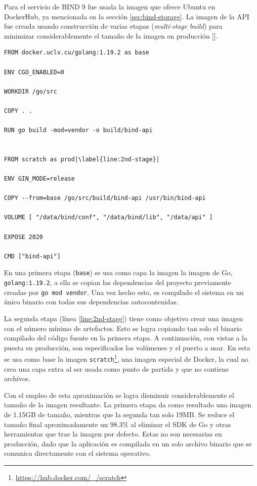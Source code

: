 Para el servicio de BIND 9 fue usada la imagen que ofrece Ubuntu en DockerHub, ya mencionada en la sección \ref{sec:bind-storage}. La imagen de la API fue creada usando construcción de varias etapas (\textit{multi-stage build}) para minimizar considerablemente el tamaño de la imagen en producción [\cite{multi-stage}].

\begin{lstlisting}[frame=single, escapechar=|, caption=Dockerfile para la API.]
FROM docker.uclv.cu/golang:1.19.2 as base

ENV CGO_ENABLED=0

WORKDIR /go/src

COPY . .

RUN go build -mod=vendor -o build/bind-api
    

FROM scratch as prod|\label{line:2nd-stage}|

ENV GIN_MODE=release

COPY --from=base /go/src/build/bind-api /usr/bin/bind-api

VOLUME [ "/data/bind/conf", "/data/bind/lib", "/data/api" ]

EXPOSE 2020

CMD ["bind-api"]
\end{lstlisting}

En una primera etapa (\verb|base|) se usa como capa la imagen la imagen de Go, \verb|golang:1.19.2|, a ella se copian las dependencias del proyecto previamente creadas por \verb|go mod vendor|. Una vez hecho esto, es compilado el sistema en un único binario con todas sus dependencias autocontenidas.

La segunda etapa (línea \ref{line:2nd-stage}) tiene como objetivo crear una imagen con el número mínimo de artefactos. Esto se logra copiando tan solo el binario compilado del código fuente en la primera etapa. A continuación, con vistas a la puesta en producción, son especificados los volúmenes y el puerto a usar. En esta se usa como base la imagen \verb|scratch|\footnote{\url{https://hub.docker.com/_/scratch}}, una imagen especial de Docker, la cual no crea una capa extra al ser usada como punto de partida y que no contiene archivos.

Con el empleo de esta aproximación se logra disminuir considerablemente el tamaño de la imagen resultante. La primera etapa da como resultado una imagen de 1.15GB de tamaño, mientras que la segunda tan solo 19MB. Se reduce el tamaño final aproximadamente un 98.3\% al eliminar el SDK de Go y otras herramientas que trae la imagen por defecto. Estas no son necesarias en producción, dado que la aplicación es compilada en un solo archivo binario que se comunica directamente con el sistema operativo.


